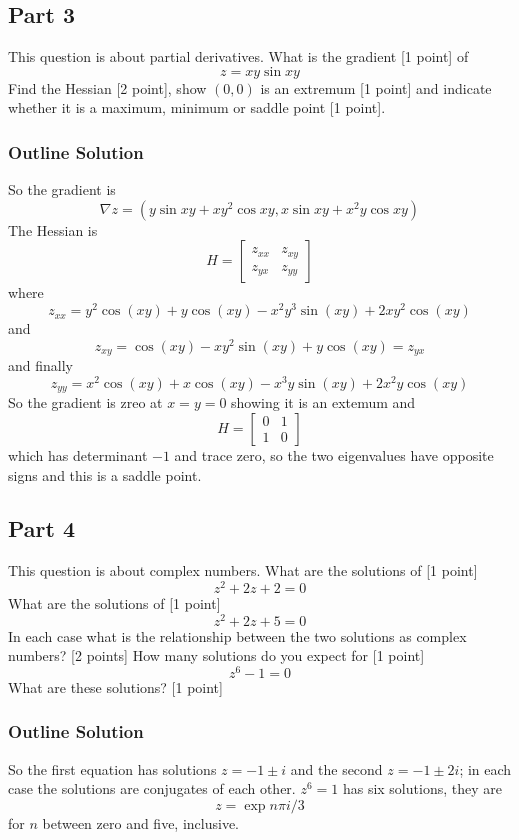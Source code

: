 \documentclass[11pt,a4paper]{scrartcl}
\begin{document}
      \subsection*{Part 3}
      This question is about partial derivatives. What is the gradient [1 point] of
      $$
      z=xy\sin{xy}
      $$
      Find the Hessian [2 point], show $(0,0)$ is an extremum [1 point] and indicate whether it is a maximum, minimum or saddle point [1 point].

      \subsubsection{Outline Solution}
      So the gradient is
      $$\nabla z=\left(y\sin{xy}+xy^2\cos{xy},x\sin{xy}+x^2y\cos{xy}\right)$$
      The Hessian is
      $$H=\left[\begin{array}{cc}z_{xx}&z_{xy}\\z_{yx}&z_{yy}\end{array}\right]$$
      where
      $$z_{xx} = y^2\cos(xy) + y\cos(xy) - x^2y^3\sin(xy) + 2xy^2\cos(xy)$$
      and
      $$z_{xy} = \cos(xy) - xy^2\sin(xy) + y\cos(xy)=z_{yx}$$
      and finally
$$z_{yy}= x^2\cos(xy) + x\cos(xy) - x^3y\sin(xy) + 2x^2y\cos(xy)$$
      So the gradient is zreo at $x=y=0$ showing it is an extemum and
      $$H=\left[\begin{array}{cc}0&1\\1&0\end{array}\right]$$
      which has determinant $-1$ and trace zero, so the two eigenvalues have opposite signs and this is a saddle point.

      \subsection*{Part 4}
      This question is about complex numbers. What are the solutions of [1 point]
      $$z^2+2z+2=0$$
      What are the solutions of [1 point]
      $$z^2+2z+5=0$$
      In each case what is the relationship between the two solutions as complex numbers? [2 points]
      How many solutions do you expect for [1 point]
      $$z^{6}-1=0$$
      What are these solutions? [1 point]

      \subsubsection*{Outline Solution}
      So the first equation has solutions $z=-1\pm i$ and the second $z=-1\pm 2i$; in each case the solutions are conjugates of each other. $z^6=1$ has six solutions, they are
      \begin{equation}
        z=\exp{n\pi i/3}
      \end{equation}
      for $n$ between zero and five, inclusive.
\end{document}
